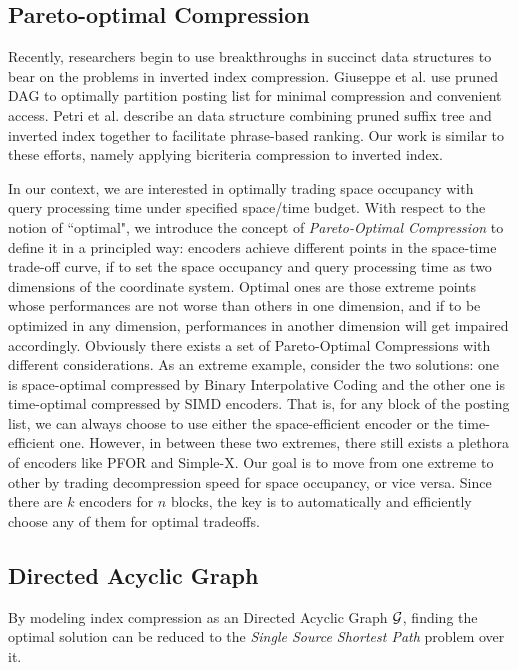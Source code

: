 \documentclass{sig-alternate-05-2015}
\begin{document}
\subsection{Pareto-optimal Compression}
Recently, researchers begin to use breakthroughs in succinct data structures to bear on the problems in inverted index compression.
Giuseppe et al. \cite{ottaviano2014partitioned} use pruned DAG \cite{ferragina2011optimally} to optimally partition posting list for minimal compression and convenient access.
Petri et al. \cite{petri2014score} describe an data structure combining pruned suffix tree and inverted index together to facilitate phrase-based ranking.
Our work is similar to these efforts, namely applying bicriteria compression to inverted index.

In our context, we are interested in optimally trading space occupancy with query processing time under specified space/time budget.
With respect to the notion of ``optimal", we introduce the concept of \textit{Pareto-Optimal Compression} to define it in a principled way: encoders achieve different points in the space-time trade-off curve, if to set the space occupancy and query processing time as two dimensions of the coordinate system.
Optimal ones are those extreme points whose performances are not worse than others in one dimension, and if to be optimized in any dimension, performances in another dimension will get impaired accordingly.
Obviously there exists a set of Pareto-Optimal Compressions with different considerations.
As an extreme example, consider the two solutions: one is space-optimal compressed by Binary Interpolative Coding \cite{moffat2000binary} and the other one is time-optimal compressed by SIMD encoders.
That is, for any block of the posting list, we can always choose to use either the space-efficient encoder or the time-efficient one.
However, in between these two extremes, there still exists a plethora of encoders like PFOR and Simple-X.
Our goal is to move from one extreme to other by trading decompression speed for space occupancy, or vice versa.
Since there are $ k $ encoders for $ n $ blocks, the key is to automatically and efficiently choose any of them for optimal tradeoffs.

\subsection{Directed Acyclic Graph}
By modeling index compression as an Directed Acyclic Graph $ \cal G $, finding the optimal solution can be reduced to the \textit{Single Source Shortest Path} problem over it.
\end{document}
